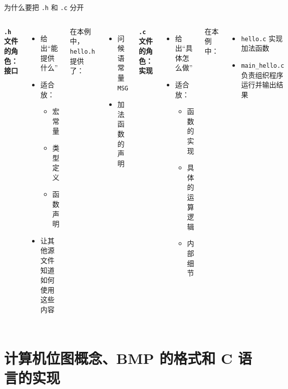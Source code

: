 \documentclass[aspectratio=169,11pt]{beamer}
\begin{document}
\begin{frame}{为什么要把 \texttt{.h} 和 \texttt{.c} 分开}
\begin{columns}[T]
\textbf{\texttt{.h} 文件的角色：接口}
\begin{itemize}
  \item 给出“能提供什么”
  \item 适合放：
  \begin{itemize}
    \item 宏常量
    \item 类型定义
    \item 函数声明
  \end{itemize}
  \item 让其他源文件知道如何使用这些内容
\end{itemize}

\vspace{0.5em}
在本例中，\texttt{hello.h} 提供了：
\begin{itemize}
  \item 问候语常量 \texttt{MSG}
  \item 加法函数的声明
\end{itemize}

\textbf{\texttt{.c} 文件的角色：实现}
\begin{itemize}
  \item 给出“具体怎么做”
  \item 适合放：
  \begin{itemize}
    \item 函数的实现
    \item 具体的运算逻辑
    \item 内部细节
  \end{itemize}
\end{itemize}

\vspace{0.5em}
在本例中：
\begin{itemize}
  \item \texttt{hello.c} 实现加法函数
  \item \texttt{main\_hello.c} 负责组织程序运行并输出结果
\end{itemize}
\end{columns}

\end{frame}
\section{计算机位图概念、BMP 的格式和 C 语言的实现}
\end{document}
